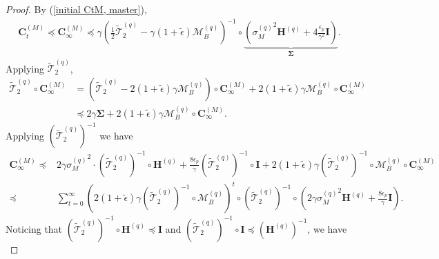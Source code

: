 \documentclass[11pt, letterpaper]{article}
\begin{document}
\begin{proof}
    By (\ref{initial CtM, master}),
    \begin{equation*}
        \begin{aligned}
            \mathbf{C}_t^{(M)}\preceq \mathbf{C}_\infty^{(M)}\preceq \gamma\left(\frac{1}{2}\widetilde{\mathcal{T}}_2^{(q)}-\gamma(1+\widetilde{\epsilon})\mathcal{M}_B^{(q)}\right)^{-1}\circ\underbrace{\left({\sigma_M^{(q)}}^2\mathbf{H}^{(q)}+4\frac{\epsilon_p}{\gamma^2}\mathbf{I}\right)}_{\boldsymbol{\Sigma}}.
        \end{aligned}
    \end{equation*}
    Applying $\widetilde{\mathcal{T}}_2^{(q)}$,
    \begin{equation*}
        \begin{aligned}
            \widetilde{\mathcal{T}}_2^{(q)}\circ\mathbf{C}_\infty^{(M)} & =(\widetilde{\mathcal{T}}_2^{(q)}-2(1+\tilde{\epsilon})\gamma\mathcal{M}_B^{(q)})\circ\mathbf{C}_\infty^{(M)}+2(1+\tilde{\epsilon})\gamma\mathcal{M}_B^{(q)}\circ\mathbf{C}_\infty^{(M)} \\
            & \preceq2\gamma\boldsymbol{\Sigma}+2(1+\tilde{\epsilon})\gamma\mathcal{M}_B^{(q)}\circ\mathbf{C}_\infty^{(M)}.
        \end{aligned}
    \end{equation*}
    Applying $(\widetilde{\mathcal{T}}_2^{(q)})^{-1}$ we have
    \begin{equation*}
        \begin{aligned}
            \mathbf{C}_{\infty}^{(M)}  \preceq&2\gamma{\sigma_M^{(q)}}^2\cdot(\widetilde{\mathcal{T}}_2^{(q)})^{-1}\circ\mathbf{H}^{(q)}+\frac{8\epsilon_p}{\gamma}(\widetilde{\mathcal{T}}_2^{(q)})^{-1}\circ\mathbf{I}
            +2(1+\tilde{\epsilon})\gamma(\widetilde{\mathcal{T}}_2^{(q)})^{-1}\circ\mathcal{M}_B^{(q)}\circ\mathbf{C}_\infty^{(M)}\\
            \preceq&\sum_{t=0}^\infty\left(2(1+\tilde{\epsilon})\gamma(\widetilde{\mathcal{T}}_2^{(q)})^{-1}\circ\mathcal{M}_B^{(q)}\right)^t\circ(\widetilde{\mathcal{T}}_2^{(q)})^{-1}\circ\left(2\gamma{\sigma_M^{(q)}}^2\mathbf{H}^{(q)}+\frac{8\epsilon_p}{\gamma}\mathbf{I}\right).
        \end{aligned}
    \end{equation*}
    Noticing that $(\widetilde{\mathcal{T}}_2^{(q)})^{-1}\circ\mathbf{H}^{(q)}  \preceq \mathbf{I}$ and $(\widetilde{\mathcal{T}}_2^{(q)})^{-1}\circ\mathbf{I}\preceq  (\mathbf{H}^{(q)})^{-1}$,
    we have
    \begin{equation}

\end{equation}
\end{proof}
\end{document}
